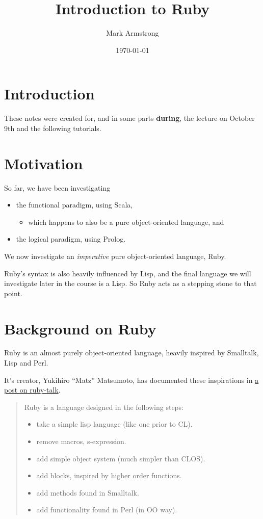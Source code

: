 \documentclass[11pt]{article}
\author{Mark Armstrong}
\date{\today}
\title{Introduction to Ruby}
\begin{document}
\maketitle
\tableofcontents


\section{Introduction}
\label{sec:orgfb4035b}
These notes were created for, and in some parts \textbf{during},
the lecture on October 9th and the following tutorials.

\section{Motivation}
\label{sec:org80dc3df}
So far, we have been investigating
\begin{itemize}
\item the functional paradigm, using Scala,
\begin{itemize}
\item which happens to also be a pure object-oriented language, and
\end{itemize}
\item the logical paradigm, using Prolog.
\end{itemize}

We now investigate an \emph{imperative} pure object-oriented language, Ruby.

Ruby's syntax is also heavily influenced by Lisp,
and the final language we will investigate later in the course
is a Lisp.
So Ruby acts as a stepping stone to that point.

\section{Background on Ruby}
\label{sec:org2b0313c}
Ruby is an almost purely object-oriented language,
heavily inspired by Smalltalk, Lisp and Perl.

It's creator, Yukihiro “Matz” Matsumoto,
has documented these inspirations in
\href{http://blade.nagaokaut.ac.jp/cgi-bin/scat.rb/ruby/ruby-talk/179642}{a post on ruby-talk}.
\begin{quote}
Ruby is a language designed in the following steps:

\begin{itemize}
\item take a simple lisp language (like one prior to CL).
\item remove macros, s-expression.
\item add simple object system (much simpler than CLOS).
\item add blocks, inspired by higher order functions.
\item add methods found in Smalltalk.
\item add functionality found in Perl (in OO way).
\end{itemize}
\end{quote}
\end{document}
